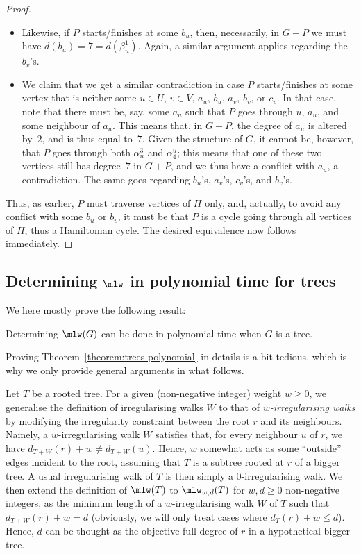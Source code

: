\documentclass[a4paper,11pt,dvipsnames]{elsarticle}
\begin{document}
\begin{proof}
\begin{itemize}
    \item Likewise, if $P$ starts/finishes at some $b_u$, then, necessarily, in $G+P$ we must have $d(b_u)=7=d(\beta_u^1)$. Again, a similar argument applies regarding the $b_v$'s.
    
    \item We claim that we get a similar contradiction in case $P$ starts/finishes at some vertex that is neither some $u \in U$, $v\in V$, $a_u$, $b_u$, $a_v$, $b_v$, or $c_v$. In that case, note that there must be, say, some $a_u$ such that $P$ goes through $u$, $a_u$, and some neighbour of $a_u$. This means that, in $G+P$, the degree of $a_u$ is altered by~$2$, and is thus equal to~$7$. Given the structure of $G$, it cannot be, however, that $P$ goes through both $\alpha_u^3$ and $\alpha^u_4$; this means that one of these two vertices still has degree~$7$ in $G+P$, and we thus have a conflict with $a_u$, a contradiction. The same goes regarding $b_u$'s, $a_v$'s, $c_v$'s, and $b_v$'s.
\end{itemize}

Thus, as earlier, $P$ must traverse vertices of $H$ only, and, actually, to avoid any conflict with some $b_u$ or $b_v$, it must be that $P$ is a cycle going through all vertices of $H$, thus a Hamiltonian cycle. The desired equivalence now follows immediately.
\end{proof}

\subsection{Determining $\mlw$ in polynomial time for trees}

We here mostly prove the following result:

\begin{theorem}\label{theorem:trees-polynomial}
Determining $\mlw(G)$ can be done in polynomial time when $G$ is a tree.
\end{theorem}

\noindent Proving Theorem~\ref{theorem:trees-polynomial} in details is a bit tedious, which is why we only provide general arguments in what follows.

Let $T$ be a rooted tree. For a given (non-negative integer) weight $w\ge 0$, we generalise the definition of
irregularising walks $W$ to that of \textit{$w$-irregularising walks} by modifying the irregularity constraint between
the root $r$ and its neighbours. Namely, a $w$-irregularising walk $W$ satisfies that, for every neighbour $u$ of $r$, we have $d_{T+W}(r)+w\neq d_{T+W}(u)$.
Hence, $w$ somewhat acts as some ``outside'' edges incident to the root, assuming that $T$ is a subtree rooted at $r$ of a bigger tree. A usual irregularising walk of $T$ is then simply a $0$-irregularising walk.
We then extend the definition of $\mlw(T)$ to $\mlw_{w,d}(T)$ for $w,d\ge 0$ non-negative integers, as the
minimum length of a $w$-irregularising walk $W$ of $T$ such that $d_{T+W}(r)+w=d$ (obviously, we will only treat cases where $d_{T}(r)+w \leq d$).
Hence, $d$ can be thought as the objective full degree of $r$ in a hypothetical bigger tree.
\end{document}

